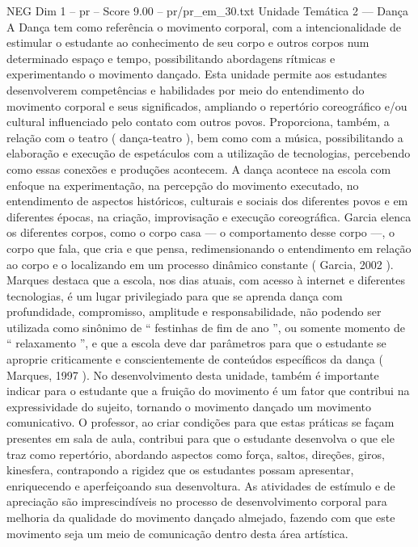 \begin{textsample}{NEG Dim 1 – pr – Score 9.00 – pr/pr\_em\_30.txt}  \label{ex:f1_neg_270}
Unidade Temática 2 — Dança A Dança tem como referência o movimento corporal, com a intencionalidade de estimular o estudante ao conhecimento de seu corpo e outros corpos num determinado espaço e tempo, possibilitando abordagens rítmicas e experimentando o movimento dançado.
Esta unidade permite aos estudantes desenvolverem competências e habilidades por meio do entendimento do movimento corporal e seus significados, ampliando o repertório coreográfico e/ou cultural influenciado pelo contato com outros povos.
Proporciona, também, a relação com o teatro ( dança-teatro ), bem como com a música, possibilitando a elaboração e execução de espetáculos com a utilização de tecnologias, percebendo como essas conexões e produções acontecem.
A dança acontece na escola com enfoque na experimentação, na percepção do movimento executado, no entendimento de aspectos históricos, culturais e sociais dos diferentes povos e em diferentes épocas, na criação, improvisação e execução coreográfica.
Garcia elenca os diferentes corpos, como o corpo casa — o comportamento desse corpo —, o corpo que fala, que cria e que pensa, redimensionando o entendimento em relação ao corpo e o localizando em um processo dinâmico constante ( Garcia, 2002 ).
Marques destaca que a escola, nos dias atuais, com acesso à internet e diferentes tecnologias, é um lugar privilegiado para que se aprenda dança com profundidade, compromisso, amplitude e responsabilidade, não podendo ser utilizada como sinônimo de “ festinhas de fim de ano ”, ou somente momento de “ relaxamento ”, e que a escola deve dar parâmetros para que o estudante se aproprie criticamente e conscientemente de conteúdos específicos da dança ( Marques, 1997 ).
No desenvolvimento desta unidade, também é importante indicar para o estudante que a fruição do movimento é um fator que contribui na expressividade do sujeito, tornando o movimento dançado um movimento comunicativo.
O professor, ao criar condições para que estas práticas se façam presentes em sala de aula, contribui para que o estudante desenvolva o que ele traz como repertório, abordando aspectos como força, saltos, direções, giros, kinesfera, contrapondo a rigidez que os estudantes possam apresentar, enriquecendo e aperfeiçoando sua desenvoltura.
As atividades de estímulo e de apreciação são imprescindíveis no processo de desenvolvimento corporal para melhoria da qualidade do movimento dançado almejado, fazendo com que este movimento seja um meio de comunicação dentro desta área artística.

\end{textsample}
